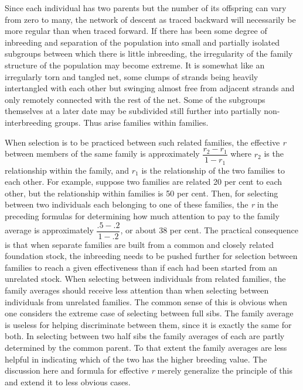 Since each individual has two parents but the number of its offspring
can vary from zero to many, the network of descent as traced
backward will necessarily be more regular than when traced forward. If
there has been some degree of inbreeding and separation of the population
into small and partially isolated subgroups between which there
is little inbreeding, the irregularity of the family structure of the population
may become extreme. It is somewhat like an irregularly torn and
tangled net, some clumps of strands being heavily intertangled with
each other but swinging almost free from adjacent strands and only
remotely connected with the rest of the net. Some of the subgroups
themselves at a later date may be subdivided still further into partially
non-interbreeding groups. Thus arise families within families.

When selection is to be practiced between such related families, the
effective \textit{r} between members of the same family is approximately
$\dfrac{r_2 - r_1}{1 - r_1}$ where $r_2$ is the relationship within the
family, and $r_1$ is the relationship of the two families to each other.
For example, suppose two families are related 20 per cent to each other,
but the relationship within families is 50 per cent. Then, for selecting
between two individuals each belonging to one of these families, the
\textit{r} in the preceding formulas for determining how much attention
to pay to the family average is approximately $\dfrac{.5 - .2}{1 - .2}$,
or about 38 per cent. The practical consequence is that when
separate families are built from a common and closely related foundation
stock, the inbreeding needs to be pushed further for selection
between families to reach a given effectiveness than if each had been
started from an unrelated stock. When selecting between individuals
from related families, the family averages should receive less attention
than when selecting between individuals from unrelated families. The
common sense of this is obvious when one considers the extreme case of
selecting between full sibs. The family average is useless for helping discriminate
between them, since it is exactly the same for both. In selecting
between two half sibs the family averages of each are partly
determined by the common parent. To that extent the family averages
are less helpful in indicating which of the two has the higher breeding
value. The discussion here and formula for effective \textit{r} merely generalize
the principle of this and extend it to less obvious cases.

